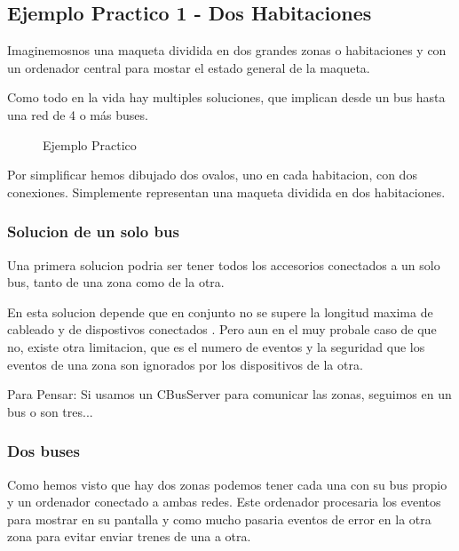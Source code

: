 \subsection{Ejemplo Practico 1 - Dos Habitaciones}
Imaginemosnos una maqueta dividida en dos grandes zonas o habitaciones y con un ordenador central para  mostar el estado general de la maqueta. 

Como todo en la vida hay multiples soluciones, que implican desde un bus hasta una red de 4 o más buses.


\begin{figure}[H]
    \centering
    \caption{Ejemplo Practico}
    \label{fig:ejPractico}
\end{figure}
Por simplificar hemos dibujado dos ovalos, uno en cada habitacion, con dos conexiones. Simplemente representan una maqueta dividida en dos habitaciones.

\subsubsection{Solucion de un solo bus}
Una primera solucion podria ser tener todos los accesorios conectados a un solo bus, tanto de una zona como de la otra.

En esta solucion depende que en conjunto no se supere la longitud maxima de cableado y de dispostivos conectados .
Pero aun en el muy probale caso de que no, existe otra limitacion, que es el numero de eventos y la seguridad que los eventos de una zona son ignorados por los dispositivos de la otra.


\begin{mdframed}
Para Pensar: Si usamos un CBusServer para comunicar las zonas, seguimos en un bus o son tres... 
\end{mdframed}

\subsubsection{Dos buses}
Como hemos visto que hay dos zonas podemos tener cada una con su bus propio y un ordenador conectado a ambas redes. Este ordenador procesaria los eventos para mostrar en su pantalla y como mucho pasaria eventos de error en la otra zona para evitar enviar trenes de una a otra.

